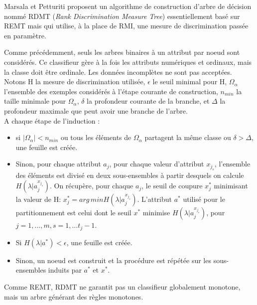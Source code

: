 \documentclass[a4paper]{article}
\begin{document}
Marsala et Petturiti proposent un algorithme de construction d'arbre de décision
nommé RDMT (\emph{Rank Discrimination Measure Tree}) essentiellement basé sur
REMT mais qui utilise, à la place de RMI, une mesure de discrimination passée en paramètre.

\noindent Comme précédemment, seuls les arbres binaires à un attribut par noeud
sont considérés. Ce classifieur gère à la fois les attributs numériques et
ordinaux, mais la classe doit être ordinale. Les données incomplètes ne sont pas
acceptées.\\

Notons H la mesure de discrimination utilisée, $\epsilon$ le seuil minimal pour
H, $\Omega_{\alpha}$ l'ensemble des exemples considérés à l'étape courante de
construction, $n_{min}$ la taille minimale pour $\Omega_{\alpha}$, $\delta$ la
profondeur courante de la branche, et $\Delta$ la profondeur maximale que peut
avoir une branche de l'arbre. \\

\noindent A chaque étape de l'induction :
\begin{itemize}
    \item si $|\Omega_{\alpha}| < n_{min}$ ou tous les éléments
de $\Omega_{\alpha}$ partagent la même classe ou $\delta > \Delta$, une feuille est créée. 
    \item Sinon, pour chaque attribut $a_j$, pour chaque valeur d'attribut $x_{j_s}$, l'ensemble
des éléments est divisé en deux sous-ensembles à partir desquels on calcule
        $H(\lambda|a^{x_{j_s}}_j)$. On récupère, pour chaque $a_j$,
le seuil de coupure $x^*_j$ minimisant la valeur de H:
$x^*_{j} = arg\,min H(\lambda|a^{x_{j_s}}_j)$. L'attribut $a^*$ utilisé pour le
partitionnement est celui dont le seuil $x^*$ minimise
$H(\lambda|a^{x_{j_s}}_j)$, pour $j=1,...,m, s=1,...t_j-1.$ 
    \item Si $H(\lambda|a^*) < \epsilon$, une feuille est créée. 
    \item Sinon, un noeud est construit et la
procédure est répétée sur les sous-ensembles induits par $a^*$ et $x^*$. \\
\end{itemize}

\noindent Comme REMT, RDMT ne garantit pas un classifieur globalement monotone, mais
un arbre générant des règles monotones.  \\
\end{document}
